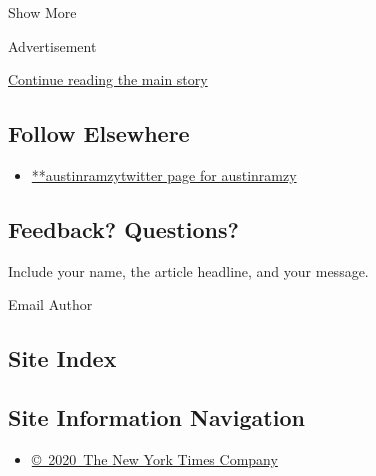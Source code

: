 Show More

Advertisement

\protect\hyperlink{after-mid2}{Continue reading the main story}

\hypertarget{follow-elsewhere}{%
\subsection{Follow Elsewhere}\label{follow-elsewhere}}

\begin{itemize}
\tightlist
\item
  \href{https://twitter.com/austinramzy}{**austinramzytwitter page for
  austinramzy}
\end{itemize}

\hypertarget{feedback-questions}{%
\subsection{Feedback? Questions?}\label{feedback-questions}}

Include your name, the article headline, and your message.

Email Author

\hypertarget{site-index}{%
\subsection{Site Index}\label{site-index}}

\hypertarget{site-information-navigation}{%
\subsection{Site Information
Navigation}\label{site-information-navigation}}

\begin{itemize}
\tightlist
\item
  \href{https://help.nytimes.com/hc/en-us/articles/115014792127-Copyright-notice}{©~2020~The
  New York Times Company}
\end{itemize}

